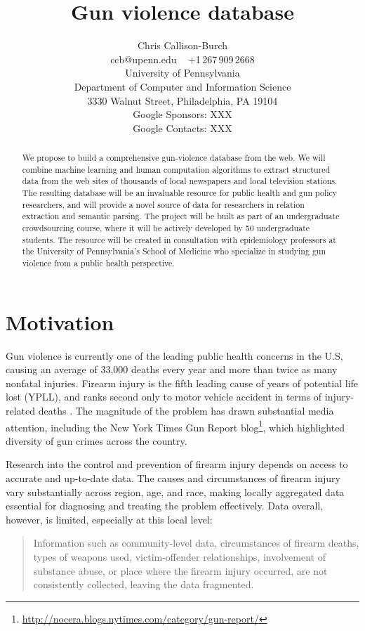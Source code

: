 \documentclass[11pt]{article}
\title{Gun violence database}
\author{Chris Callison-Burch \\
 ccb@upenn.edu ~ +1\,267\,909\,2668 \\
 University of Pennsylvania \\
 Department of Computer and Information Science \\
 3330 Walnut Street, Philadelphia, PA 19104 \\
 Google Sponsors: XXX \\
 Google Contacts: XXX}
\date{}
\begin{document}
\maketitle

\begin{abstract}
We propose to build a comprehensive gun-violence database from the web. We will combine machine learning and human computation algorithms to extract structured data from the web sites of thousands of local newspapers and local television stations. The resulting database will be an invaluable resource for public health and gun policy researchers, and will provide a novel source of data for researchers in relation extraction and semantic parsing. The project will be built as part of an undergraduate crowdsourcing course, where it will be actively developed by 50 undergraduate students.  The resource will be created in consultation with epidemiology professors at the University of Pennsylvania's School of Medicine who specialize in studying gun violence from a public health perspective. 
\end{abstract}

\section{Motivation}

Gun violence is currently one of the leading public health concerns in the U.S, causing an average of 33,000 deaths every year and more than twice as many nonfatal injuries. Firearm injury is the fifth leading cause of years of potential life lost (YPLL), and ranks second only to motor vehicle accident in terms of injury-related deaths  \cite{ficapresourcebook} . The magnitude of the problem has drawn substantial media attention, including the New York Times Gun Report blog\footnote{\url{http://nocera.blogs.nytimes.com/category/gun-report/}}, which highlighted diversity of gun crimes across the country.

Research into the control and prevention of firearm injury depends on access to accurate and up-to-date data. The causes and circumstances of firearm injury vary substantially across region, age, and race, making locally aggregated data essential for diagnosing and treating the problem effectively. Data overall, however, is limited, especially at this local level:

\begin{quote}
Information such as community-level data, circumstances of firearm deaths, types of weapons used, victim-offender relationships, involvement of substance abuse, or place where the firearm injury occurred, are not consistently collected, leaving the data fragmented. \cite{ficapresourcebook} 
\end{quote}
\end{document}
